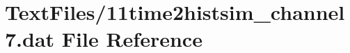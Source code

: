 \hypertarget{11time2histsim__channel7_8dat}{}\section{Text\+Files/11time2histsim\+\_\+channel7.dat File Reference}
\label{11time2histsim__channel7_8dat}
